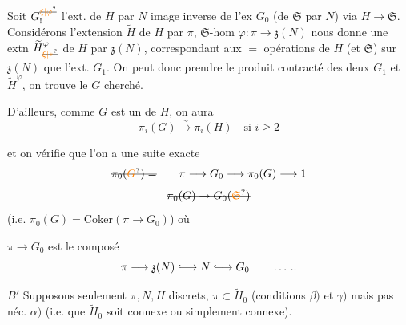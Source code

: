 Soit \(G_{!}^{\deleted{\unsure{\xi|\varphi}}}\) l'ext. de \(H\) par \(N\) image inverse de l'ex \(G_0\) (de \(\mathfrak{S}\) par \(N\)) via \(H\to\mathfrak{S}\). Considérons l'extension \(\widetilde H\) de \(H\) par \(\pi\),  \(\mathfrak{S}\)-hom \(\varphi:\pi\to\mathfrak{z}(N)\) nous donne une extn  \(\widetilde H^{\varphi}_{\deleted{\unsure{\xi|\ast}}}\) de \(H\) par \(\mathfrak{z}(N)\), correspondant aux \(=\) opérations de \(H\) (et \(\mathfrak{S}\)) sur \(\mathfrak{z}(N)\) que l'ext. \(G_1\). On peut donc prendre le produit contracté des deux  \(G_1\) et \(\widetilde H^\varphi\), on trouve le \(G\) cherché.

D'ailleurs,  comme \(G\) est un  de \(H\), on aura
\[
 \pi_i(G)\xrightarrow{\sim}\pi_i(H)\quad\text{si }i\geq2
\]

et on vérifie que l'on a une suite exacte
\[
 \deleted{\pi_0(\unsure{G})=}\qquad
 \pi\longrightarrow G_0\longrightarrow\pi_0(G)\longrightarrow1
\]
\[
 \deleted{\pi_0(G)\to G_0(\unsure{\mathfrak{S}})}
\]
(i.e. \(\pi_0(G)=\mathrm{Coker}(\pi\to G_0)\)) où

\(\pi\to G_0\) est le composé
\[
 \pi\longrightarrow\mathfrak{z}(N)\lhook\joinrel\longrightarrow N\lhook\joinrel\longrightarrow G_0\qquad \ldots\,..
\]

\textcircled{\(B'\)} Supposons seulement \(\pi,N,H\) discrets, \(\pi\subset\widetilde H_0\) (conditions \(\beta)\) et \(\gamma)\) mais pas néc. \(\alpha)\) (i.e. que \(\widetilde H_0\) soit connexe ou simplement connexe).

